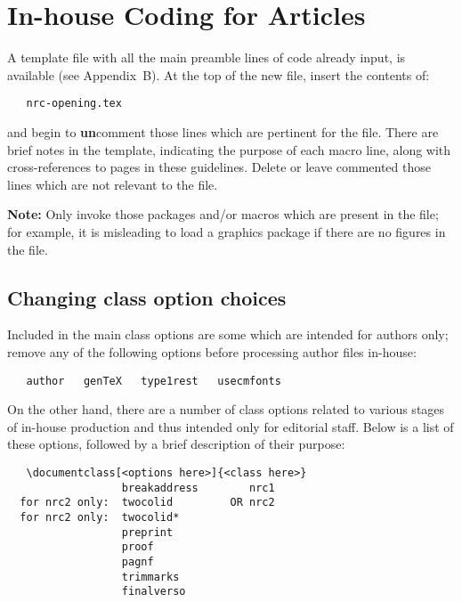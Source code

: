 \newpage


\section{In-house Coding for Articles\label{inhouse}}

A template file with all the main preamble lines of code already
input, is available (see Appendix~B). At the top of the new file,
insert the contents of:
%
\begin{verbatim}
   nrc-opening.tex
\end{verbatim}
%
and begin to {\bf un}comment those lines which are pertinent for the
file. There are brief notes in the template, indicating the purpose of
each macro line, along with cross-references to pages in these
guidelines. Delete or leave commented those lines which are not
relevant to the file.

{\bf Note:} Only invoke those packages and/or macros which are present
in the file; for example, it is misleading to load a graphics package
if there are no figures in the file.



\subsection{Changing class option choices}

Included in the main class options are some which are intended for
authors only; remove any of the following options before processing
author files in-house:

\begin{verbatim}
   author   genTeX   type1rest   usecmfonts   
\end{verbatim}

\noindent On the other hand, there are a number of class options
related to various stages of in-house production and thus intended
only for \NRC{} editorial staff. Below is a list of these options,
followed by a brief description of their purpose:

\begin{verbatim}
   \documentclass[<options here>]{<class here>}
                  breakaddress        nrc1
  for nrc2 only:  twocolid         OR nrc2
  for nrc2 only:  twocolid*
                  preprint      
                  proof
                  pagnf
                  trimmarks
                  finalverso
\end{verbatim}

